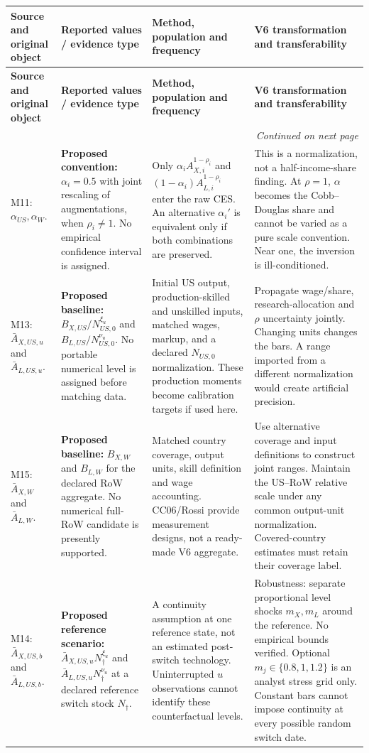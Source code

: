 \documentclass[10pt,a4paper,landscape]{article}
\makeatletter
\newenvironment{evidence}{%
\fontsize{9.4}{10.9}\selectfont\setlength{\parskip}{2pt}
\begin{longtable}{@{}P{\dimexpr .22\textwidth-7.5pt\relax}P{\dimexpr .24\textwidth-7.5pt\relax}P{\dimexpr .25\textwidth-7.5pt\relax}P{\dimexpr .29\textwidth-7.5pt\relax}@{}}
\toprule\rowcolor{tablehead}\textbf{Source and original object} & \textbf{Reported values / evidence type} & \textbf{Method, population and frequency} & \textbf{V6 transformation and transferability}\\\midrule
\endfirsthead
\toprule\rowcolor{tablehead}\textbf{Source and original object} & \textbf{Reported values / evidence type} & \textbf{Method, population and frequency} & \textbf{V6 transformation and transferability}\\\midrule
\endhead
\midrule\multicolumn{4}{r}{\footnotesize\itshape Continued on next page}\\\endfoot
\bottomrule\endlastfoot
}{\end{longtable}}
\makeatother
\begin{document}
\begin{evidence}
M11: $\alpha_{US},\alpha_W$.
&
\textbf{Proposed convention:} $\alpha_i=0.5$ with joint rescaling of augmentations,
when $\rho_i\ne1$. No empirical confidence interval is assigned.
&
Only $\alpha_iA_{X,i}^{1-\rho_i}$ and
$(1-\alpha_i)A_{L,i}^{1-\rho_i}$ enter the raw CES.
An alternative $\alpha_i'$ is equivalent only if both combinations are preserved.
&
This is a normalization, not a half-income-share finding.
At $\rho=1$, $\alpha$ becomes the Cobb--Douglas share and cannot be varied
as a pure scale convention. Near one, the inversion is ill-conditioned.
\\[5pt]
M13: $\bar A_{X,US,u}$ and $\bar A_{L,US,u}$.
&
\textbf{Proposed baseline:}
$B_{X,US}/N_{US,0}^{\xi_u}$ and
$B_{L,US}/N_{US,0}^{\nu_u}$.
No portable numerical level is assigned before matching data.
&
Initial US output, production-skilled and unskilled inputs, matched wages,
markup, and a declared $N_{US,0}$ normalization. These production moments
become calibration targets if used here.
&
Propagate wage/share, research-allocation and $\rho$ uncertainty jointly.
Changing units changes the bars. A range imported from a different normalization
would create artificial precision.
\\[5pt]
M15: $\bar A_{X,W}$ and $\bar A_{L,W}$.
&
\textbf{Proposed baseline:} $B_{X,W}$ and $B_{L,W}$ for the declared RoW aggregate.
No numerical full-RoW candidate is presently supported.
&
Matched country coverage, output units, skill definition and wage accounting.
CC06/Rossi provide measurement designs, not a ready-made V6 aggregate.
&
Use alternative coverage and input definitions to construct joint ranges.
Maintain the US--RoW relative scale under any common output-unit normalization.
Covered-country estimates must retain their coverage label.
\\[5pt]
M14: $\bar A_{X,US,b}$ and $\bar A_{L,US,b}$.
&
\textbf{Proposed reference scenario:}
$\bar A_{X,US,u}N_\dagger^{\xi_u}$ and
$\bar A_{L,US,u}N_\dagger^{\nu_u}$ at a declared reference switch stock $N_\dagger$.
&
A continuity assumption at one reference state, not an estimated post-switch technology.
Uninterrupted $u$ observations cannot identify these counterfactual levels.
&
Robustness: separate proportional level shocks $m_X,m_L$ around the reference.
No empirical bounds verified. Optional $m_j\in\{0.8,1,1.2\}$ is an analyst stress grid only.
Constant bars cannot impose continuity at every possible random switch date.
\\[5pt]
\end{evidence}
\end{document}
